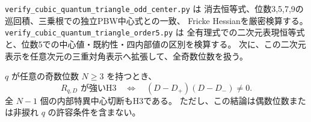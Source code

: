 \texttt{verify\_\allowbreak cubic\_\allowbreak quantum\_\allowbreak triangle\_\allowbreak \allowbreak odd\_\allowbreak center.py} は
消去恒等式、位数3,5,7,9の巡回積、三乗根での独立PBW中心式との一致、
Fricke Hessianを厳密検算する。
\texttt{verify\_\allowbreak cubic\_\allowbreak quantum\_\allowbreak triangle\_\allowbreak \allowbreak order5.py} は
全有理式での二次元表現恒等式と、位数5での中心値・既約性・四内部値の区別を検算する。
次に、この二次元表示を任意次元の三重対角表示へ拡張して、全奇数位数を扱う。

\begin{theorem}[全奇数位数の三角境界pencilの完全判定]
\label{thm:quantum-triangle-all-odd}
$q$ が任意の奇数位数 $N\ge3$ を持つとき、
\[
 R_{q,D}\text{ が強いH3}\quad\Longleftrightarrow\quad
 (D-D_+)(D-D_-)\ne0.
\]
全 $N-1$ 個の内部特異中心切断もH3である。
ただし、この結論は偶数位数または非捩れ $q$ の許容条件を含まない。
\end{theorem}
